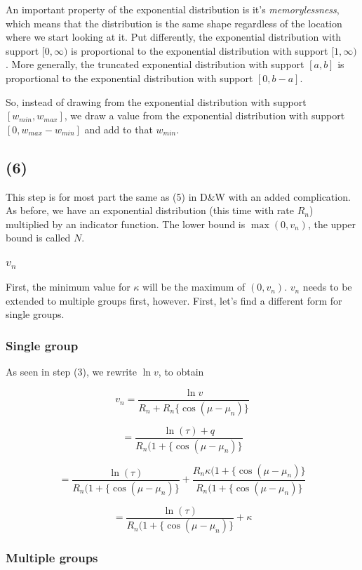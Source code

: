 \documentclass[12pt,a4paper]{article}
\begin{document}
An important property of the exponential distribution is it's \textit{memorylessness}, which means that the distribution is the same shape regardless of the location where we start looking at it. Put differently, the exponential distribution with support $[0, \infty)$ is proportional to the exponential distribution with support $[1, \infty)$. More generally, the truncated exponential distribution with support $[a, b]$ is proportional to the exponential distribution with support $[0, b-a]$. 

So, instead of drawing from the exponential distribution with support $[w_{min}, w_{max}]$, we draw a value from the exponential distribution with support $[0, w_{max} - w_{min}]$ and add to that $w_{min}$. 

\subsection{(6)}
This step is for most part the same as (5) in D\&W with an added complication. As before, we have an exponential distribution (this time with rate $R_n$) multiplied by an indicator function. The lower bound is $\max(0, v_n)$, the upper bound is called $N$. 

\subsubsection{$v_n$}
First, the minimum value for $\kappa$ will be the maximum of $(0, v_n)$. $v_n$ needs to be extended to multiple groups first, however. First, let's find a different form for single groups.

\subsubsection*{Single group}

As seen in step (3), we rewrite $\ln v$, to obtain

$$v_n = \frac{\ln v}{R_n + R_n  \{  \cos(\mu - \mu_n) \} } $$

$$ = \frac{\ln (\tau) + q }{R_n(1+ \{ \cos(\mu - \mu_n) \} } $$

$$ = \frac{\ln (\tau) }{R_n(1+ \{ \cos(\mu - \mu_n) \} } +  \frac{R_n \kappa (1+ \{ \cos(\mu - \mu_n) \}}{R_n(1+ \{ \cos(\mu - \mu_n) \} } $$

$$ = \frac{\ln (\tau) }{R_n(1+ \{ \cos(\mu - \mu_n) \} } +  \kappa $$

\subsubsection*{Multiple groups}
\end{document}
